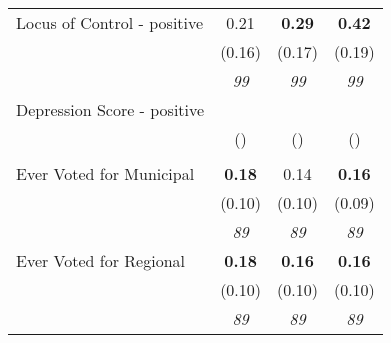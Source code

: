 \begin{tabular}{l c c c}
Locus of Control - positive & 0.21 & \textbf{ 0.29 } & \textbf{ 0.42 } \\
& (0.16) & (0.17) & (0.19) \\
& \textit{ 99 } & \textit{ 99 } & \textit{ 99 } \\
Depression Score - positive & & & \\
& () & () & () \\
& & & \\
Ever Voted for Municipal & \textbf{ 0.18 } & 0.14 & \textbf{ 0.16 } \\
& (0.10) & (0.10) & (0.09) \\
& \textit{ 89 } & \textit{ 89 } & \textit{ 89 } \\
Ever Voted for Regional & \textbf{ 0.18 } & \textbf{ 0.16 } & \textbf{ 0.16 } \\
& (0.10) & (0.10) & (0.10) \\
& \textit{ 89 } & \textit{ 89 } & \textit{ 89 } \\
\bottomrule
\end{tabular}
